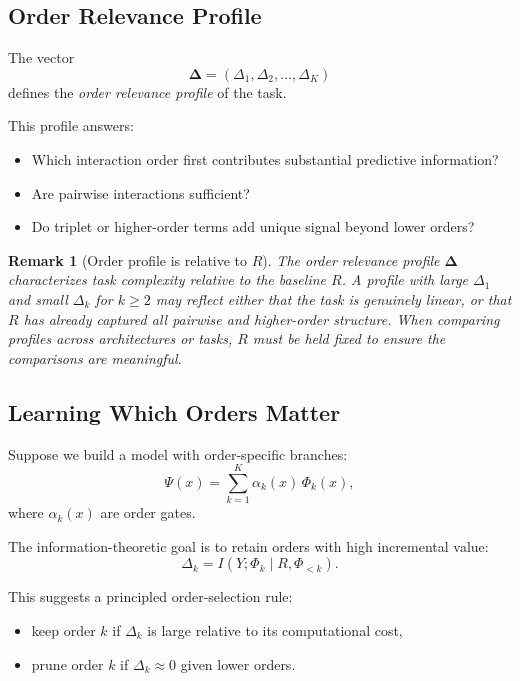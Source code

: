 \documentclass[11pt]{article}
\newtheorem{remark}{Remark}
\newcommand{\1}{\mathbf{1}}
\begin{document}
\subsection{Order Relevance Profile}

The vector
\begin{equation}
\bm{\Delta}
=
(\Delta_1,\Delta_2,\ldots,\Delta_K)
\label{eq:delta_profile}
\end{equation}
defines the \emph{order relevance profile} of the task.

This profile answers:
\begin{itemize}[leftmargin=1.5em]
    \item Which interaction order first contributes substantial predictive information?
    \item Are pairwise interactions sufficient?
    \item Do triplet or higher-order terms add unique signal beyond lower orders?
\end{itemize}

\begin{remark}[Order profile is relative to $R$]
The order relevance profile $\bm{\Delta}$ characterizes task complexity
\emph{relative to the baseline $R$}.
A profile with large $\Delta_1$ and small $\Delta_k$ for $k \ge 2$ may reflect either that the
task is genuinely linear, or that $R$ has already captured all pairwise and higher-order structure.
When comparing profiles across architectures or tasks, $R$ must be held fixed to ensure
the comparisons are meaningful.
\end{remark}

\subsection{Learning Which Orders Matter}

Suppose we build a model with order-specific branches:
\[
\Psi(x) = \sum_{k=1}^K \alpha_k(x)\,\Phi_k(x),
\]
where $\alpha_k(x)$ are order gates.

The information-theoretic goal is to retain orders with high incremental value:
\[
\Delta_k = I(Y;\Phi_k \mid R,\Phi_{<k}).
\]

This suggests a principled order-selection rule:
\begin{itemize}[leftmargin=1.5em]
    \item keep order $k$ if $\Delta_k$ is large relative to its computational cost,
    \item prune order $k$ if $\Delta_k \approx 0$ given lower orders.
\end{itemize}
\end{document}
